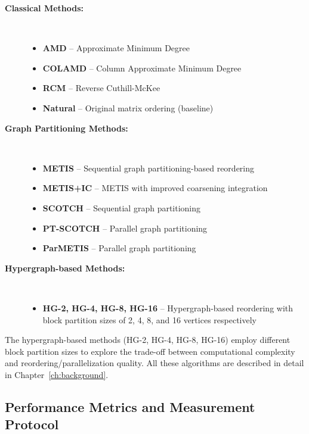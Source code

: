 \begin{description}
   \item[\textbf{Classical Methods:}] \mbox{}\\
   \begin{itemize}
      \item \textbf{AMD} -- Approximate Minimum Degree
      \item \textbf{COLAMD} -- Column Approximate Minimum Degree  
      \item \textbf{RCM} -- Reverse Cuthill-McKee
      \item \textbf{Natural} -- Original matrix ordering (baseline)
   \end{itemize}
   
   \item[\textbf{Graph Partitioning Methods:}] \mbox{}\\
   \begin{itemize}
      \item \textbf{METIS} -- Sequential graph partitioning-based reordering
      \item \textbf{METIS+IC} -- METIS with improved coarsening integration
      \item \textbf{SCOTCH} -- Sequential graph partitioning
      \item \textbf{PT-SCOTCH} -- Parallel graph partitioning
      \item \textbf{ParMETIS} -- Parallel graph partitioning
   \end{itemize}
   
   \item[\textbf{Hypergraph-based Methods:}] \mbox{}\\
   \begin{itemize}
      \item \textbf{HG-2, HG-4, HG-8, HG-16} -- Hypergraph-based reordering with block partition sizes of 2, 4, 8, and 16 vertices respectively
   \end{itemize}
\end{description}

The hypergraph-based methods (HG-2, HG-4, HG-8, HG-16) employ different block partition sizes to explore the trade-off between computational complexity and reordering/parallelization quality. All these algorithms are described in detail in Chapter~\ref{ch:background}.

\subsection{Performance Metrics and Measurement Protocol}

